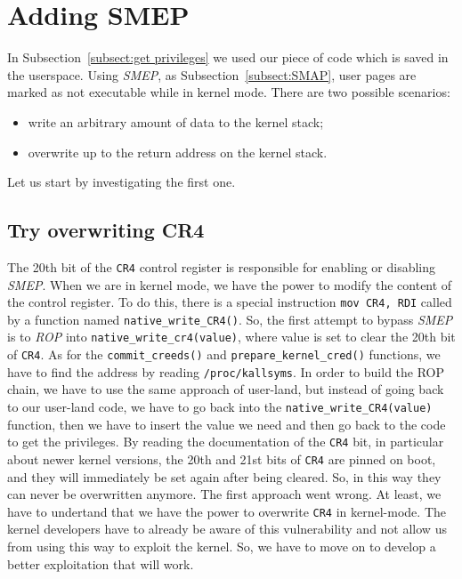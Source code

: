 \documentclass{masterthesis}
\newcommand{\refToSubSection}[1]{Subsection~\ref{subsect:#1}\xspace}
\begin{document}
\section{Adding SMEP}
\label{sect:addSmep}
In \refToSubSection{get privileges} we used our piece of code which is saved in the userspace. Using \emph{SMEP}, as \refToSubSection{SMAP}, user pages are marked as not executable while in kernel mode.
There are two possible scenarios:
\begin{itemize}
\item write an arbitrary amount of data to the kernel stack;
\item overwrite up to the return address on the kernel stack.
\end{itemize}
Let us start by investigating the first one.
\subsection{Try overwriting CR4}
\label{subsect:CR4}
The 20th bit of the \texttt{CR4} control register is responsible for enabling or disabling \emph{SMEP}.
When we are in kernel mode, we have the power to modify the content of the control register.
To do this, there is a special instruction \lstinline{mov CR4, RDI} called by a function named \texttt{native\_write\_CR4()}.
So, the first attempt to bypass \emph{SMEP} is to \emph{ROP} into \texttt{native\_write\_cr4(value)}, where value is set to clear the 20th bit of \texttt{CR4}.
As for the \texttt{commit\_creeds()} and \texttt{prepare\_kernel\_cred()} functions, we have to find the address by reading \lstinline{/proc/kallsyms}.
In order to build the ROP chain, we have to use the same approach of user-land, but instead of going back to our user-land code, we have to go back into the \texttt{native\_write\_CR4(value)} function, then we have to insert the value we need and then go back to the code to get the privileges.
By reading the documentation of the \texttt{CR4} bit, in particular about newer kernel versions, the 20th and 21st bits of \texttt{CR4} are pinned on boot, and they will immediately be set again after being cleared. So, in this way they can never be overwritten anymore.
The first approach went wrong. At least, we have to undertand that we have the power to overwrite \texttt{CR4} in kernel-mode. The kernel developers have to already be aware of this vulnerability and not allow us from using this way to exploit the kernel. So, we have to move on to develop a better exploitation that will work.
\end{document}
